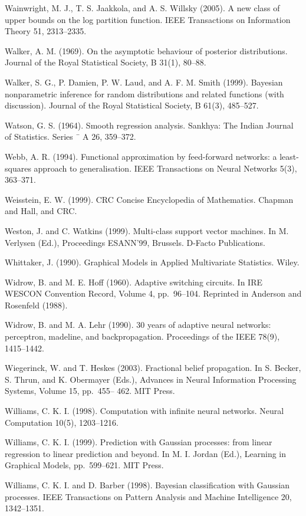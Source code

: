 \documentclass[
  10
]{article}
\begin{document}
Wainwright, M. J., T. S. Jaakkola, and A. S. Willsky (2005). A new class
of upper bounds on the log partition function. IEEE Transactions on
Information Theory 51, 2313--2335.

Walker, A. M. (1969). On the asymptotic behaviour of posterior
distributions. Journal of the Royal Statistical Society, B 31(1),
80--88.

Walker, S. G., P. Damien, P. W. Laud, and A. F. M. Smith (1999).
Bayesian nonparametric inference for random distributions and related
functions (with discussion). Journal of the Royal Statistical Society, B
61(3), 485--527.

Watson, G. S. (1964). Smooth regression analysis. Sankhya: The Indian
Journal of Statistics. Series ¯ A 26, 359--372.

Webb, A. R. (1994). Functional approximation by feed-forward networks: a
least-squares approach to generalisation. IEEE Transactions on Neural
Networks 5(3), 363--371.

Weisstein, E. W. (1999). CRC Concise Encyclopedia of Mathematics.
Chapman and Hall, and CRC.

Weston, J. and C. Watkins (1999). Multi-class support vector machines.
In M. Verlysen (Ed.), Proceedings ESANN'99, Brussels. D-Facto
Publications.

Whittaker, J. (1990). Graphical Models in Applied Multivariate
Statistics. Wiley.

Widrow, B. and M. E. Hoff (1960). Adaptive switching circuits. In IRE
WESCON Convention Record, Volume 4, pp.~96--104. Reprinted in Anderson
and Rosenfeld (1988).

Widrow, B. and M. A. Lehr (1990). 30 years of adaptive neural networks:
perceptron, madeline, and backpropagation. Proceedings of the IEEE
78(9), 1415--1442.

Wiegerinck, W. and T. Heskes (2003). Fractional belief propagation. In
S. Becker, S. Thrun, and K. Obermayer (Eds.), Advances in Neural
Information Processing Systems, Volume 15, pp.~455-- 462. MIT Press.

Williams, C. K. I. (1998). Computation with infinite neural networks.
Neural Computation 10(5), 1203--1216.

Williams, C. K. I. (1999). Prediction with Gaussian processes: from
linear regression to linear prediction and beyond. In M. I. Jordan
(Ed.), Learning in Graphical Models, pp.~599--621. MIT Press.

Williams, C. K. I. and D. Barber (1998). Bayesian classification with
Gaussian processes. IEEE Transactions on Pattern Analysis and Machine
Intelligence 20, 1342--1351.
\end{document}
